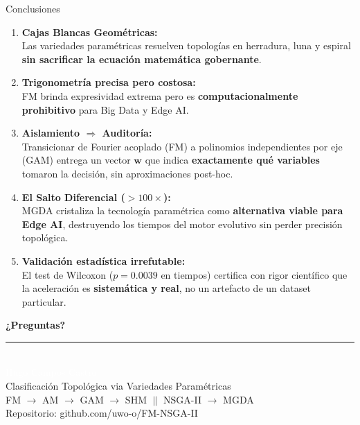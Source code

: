 \documentclass[aspectratio=169,10pt]{beamer}
\newcommand{\highlight}[1]{\textcolor{accent}{\textbf{#1}}}
\begin{document}
\begin{frame}{Conclusiones}
  \begin{enumerate}
    \item \highlight{Cajas Blancas Geométricas:}\\
    Las variedades paramétricas resuelven topologías en herradura, luna y espiral \textbf{sin sacrificar la ecuación matemática gobernante}.
    \vspace{6pt}

    \item \highlight{Trigonometría precisa pero costosa:}\\
    FM brinda expresividad extrema pero es \textbf{computacionalmente prohibitivo} para Big Data y Edge AI.
    \vspace{6pt}

    \item \highlight{Aislamiento $\Rightarrow$ Auditoría:}\\
    Transicionar de Fourier acoplado (FM) a polinomios independientes por eje (GAM) entrega un vector $\mathbf{w}$ que indica \textbf{exactamente qué variables} tomaron la decisión, sin aproximaciones post-hoc.
    \vspace{6pt}

    \item \highlight{El Salto Diferencial ($>100\times$):}\\
    MGDA cristaliza la tecnología paramétrica como \textbf{alternativa viable para Edge AI}, destruyendo los tiempos del motor evolutivo sin perder precisión topológica.
    \vspace{6pt}

    \item \highlight{Validación estadística irrefutable:}\\
    El test de Wilcoxon ($p = 0.0039$ en tiempos) certifica con rigor científico que la aceleración es \textbf{sistemática y real}, no un artefacto de un dataset particular.
  \end{enumerate}
\end{frame}

{
\begin{frame}[plain]
  \centering
  \vspace{2cm}
  {\Huge\bfseries\textcolor{accent}{¿Preguntas?}}\\[20pt]
  \rule{6cm}{0.4pt}\\[12pt]
  {\large\textcolor{white}{Hugo Campos Castro}}\\[6pt]
  {\small\textcolor{white!60}{Clasificación Topológica via Variedades Paramétricas\\FM $\to$ AM $\to$ GAM $\to$ SHM $\|$ NSGA-II $\to$ MGDA}}\\[20pt]
  {\small\textcolor{accent!70}{Repositorio: github.com/uwo-o/FM-NSGA-II}}
\end{frame}
}
\end{document}
